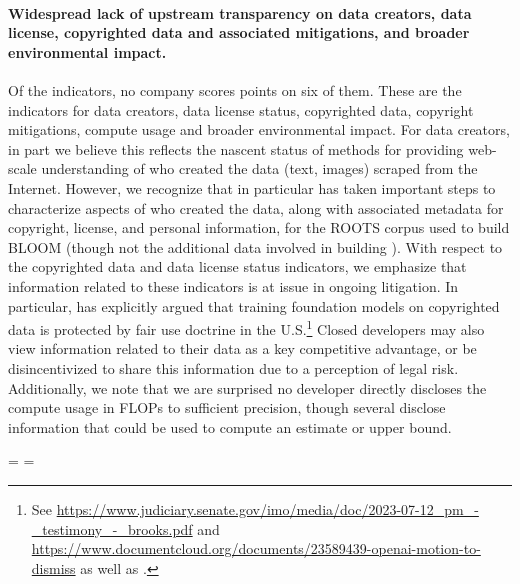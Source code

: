 \paragraph{Widespread lack of upstream transparency on data creators, data license, copyrighted data and associated mitigations, and broader environmental impact.} 
Of the \numupstreamindicators indicators, no company scores points on six of them.
These are the indicators for data creators, data license status, copyrighted data, copyright mitigations, compute usage and broader environmental impact.
For data creators, in part we believe this reflects the nascent status of methods for providing web-scale understanding of who created the data (\eg text, images) scraped from the Internet. 
However, we recognize that \huggingface in particular has taken important steps to characterize aspects of who created the data, along with associated metadata for copyright, license, and personal information, for the ROOTS corpus used to build BLOOM (though not the additional data involved in building \bloomz). 
With respect to the copyrighted data and data license status indicators, we emphasize that information related to these indicators  is at issue in ongoing litigation. 
In particular, \stability has explicitly argued that training foundation models on copyrighted data is protected by fair use doctrine in the U.S.\footnote{See \url{https://www.judiciary.senate.gov/imo/media/doc/2023-07-12_pm_-_testimony_-_brooks.pdf} and \url{https://www.documentcloud.org/documents/23589439-openai-motion-to-dismiss} as well as \citet{lemley2020fair}.} 
Closed developers may also view information related to their data as a key competitive advantage, or be disincentivized to share this information due to a perception of legal risk.
Additionally, we note that we are surprised no developer directly discloses the compute usage in FLOPs to sufficient precision, though several disclose information that could be used to compute an estimate or upper bound. 

\edef\originalwidth{\the\pdfpagewidth}
\edef\originalheight{\the\pdfpageheight}




\eject
\pdfpageheight=\originalwidth
\newlength{\mylength}
\setlength{\mylength}{\originalheight-3.4cm}
\pdfpagewidth=\mylength
{}


